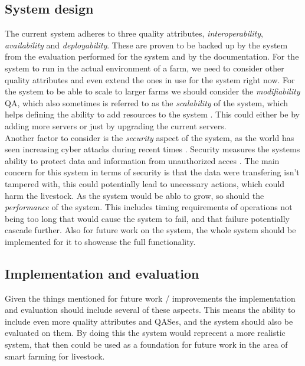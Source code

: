 \subsection{System design}
The current system adheres to three quality attributes, \textit{interoperability}, \textit{availability} and \textit{deployability}. These are proven to be backed up by the system from the evaluation performed for the system and by the documentation.
For the system to run in the actual environment of a farm, we need to consider other quality attributes and even extend the ones in use for the system right now. For the system to be able to scale to larger farms we should consider the \textit{modifiability} QA, which also sometimes is referred to as the \textit{scalability} of the system, which helps defining the ability to add resources to the system \cite{Bass2012Software}. This could either be by adding more servers or just by upgrading the current servers. \vspace{2mm} \\
Another factor to consider is the \textit{security} aspect of the system, as the world has seen increasing cyber attacks during recent times \cite{Ford_2023}. Security measures the systems ability to protect data and information from unauthorized acces \cite{Bass2012Software}. The main concern for this system in terms of security is that the data were transfering isn't tampered with, this could potentially lead to unecessary actions, which could harm the livestock.
As the system would be ablo to grow, so should the \textit{performance} of the system. This includes timing requirements \cite{Bass2012Software} of operations not being too long that would cause the system to fail, and that failure potentially cascade further. Also for future work on the system, the whole system should be implemented for it to showcase the full functionality.

\subsection{Implementation and evaluation}
Given the things mentioned for future work / improvements the implementation and evaluation should include several of these aspects. This means the ability to include even more quality attributes and QASes, and the system should also be evaluated on them. By doing this the system would reprecent a more realistic system, that then could be used as a foundation for future work in the area of smart farming for livestock.
